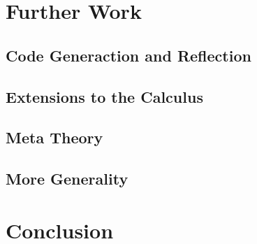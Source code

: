 \documentclass[screen,nonacm]{acmart}
\begin{document}
\section{Further Work}\label{sec:con-wrk}
\subsection*{Code Generaction and Reflection}
\subsection*{Extensions to the Calculus}
\subsection*{Meta Theory}
\subsection*{More Generality}

\section{Conclusion}\label{sec:con}


\end{document}
